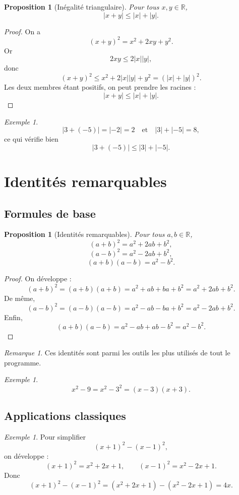 \documentclass[11pt,a4paper]{article}
\newtheorem{proposition}[definition]{Proposition}
\theoremstyle{remark}
\newtheorem{remarque}[definition]{Remarque}
\newtheorem{exemple}[definition]{Exemple}
\newcommand{\R}{\mathbb{R}}
\begin{document}
\begin{proposition}[Inégalité triangulaire]
Pour tous \(x,y\in\R\),
\[
|x+y|\leq |x|+|y|.
\]
\end{proposition}

\begin{proof}
On a
\[
(x+y)^2=x^2+2xy+y^2.
\]
Or
\[
2xy \leq 2|x||y|,
\]
donc
\[
(x+y)^2 \leq x^2+2|x||y|+y^2=(|x|+|y|)^2.
\]
Les deux membres étant positifs, on peut prendre les racines :
\[
|x+y|\leq |x|+|y|.
\]
\end{proof}

\begin{exemple}
\[
|3+(-5)|=|-2|=2
\quad \text{et} \quad
|3|+|-5|=8,
\]
ce qui vérifie bien
\[
|3+(-5)|\leq |3|+|-5|.
\]
\end{exemple}

\section{Identités remarquables}

\subsection{Formules de base}

\begin{proposition}[Identités remarquables]
Pour tous \(a,b\in\R\),
\[
(a+b)^2=a^2+2ab+b^2,
\]
\[
(a-b)^2=a^2-2ab+b^2,
\]
\[
(a+b)(a-b)=a^2-b^2.
\]
\end{proposition}

\begin{proof}
On développe :
\[
(a+b)^2=(a+b)(a+b)=a^2+ab+ba+b^2=a^2+2ab+b^2.
\]
De même,
\[
(a-b)^2=(a-b)(a-b)=a^2-ab-ba+b^2=a^2-2ab+b^2.
\]
Enfin,
\[
(a+b)(a-b)=a^2-ab+ab-b^2=a^2-b^2.
\]
\end{proof}

\begin{remarque}
Ces identités sont parmi les outils les plus utilisés de tout le programme.
\end{remarque}

\begin{exemple}
\[
x^2-9=x^2-3^2=(x-3)(x+3).
\]
\end{exemple}

\subsection{Applications classiques}

\begin{exemple}
Pour simplifier
\[
(x+1)^2-(x-1)^2,
\]
on développe :
\[
(x+1)^2=x^2+2x+1,
\qquad
(x-1)^2=x^2-2x+1.
\]
Donc
\[
(x+1)^2-(x-1)^2=(x^2+2x+1)-(x^2-2x+1)=4x.
\]
\end{exemple}
\end{document}
